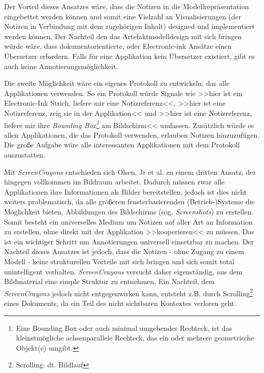 Der Vorteil dieses Ansatzes wäre, dass die Notizen in die Modellrepräsentation eingebettet werden können und somit eine Vielzahl an Visualisierungen (der Notizen in Verbindung mit dem zugehörigen Inhalt) designed und implementiert werden können. Der Nachteil den das Artefaktmodelldesign mit sich bringen würde wäre, dass dokumentorientierte, oder Electronic-ink Ansätze einen Übersetzer erfordern. Falls für eine Applikation kein Übersetzer existiert, gibt es auch keine Annotierungsmöglichkeit.

\medskip Die zweite Möglichkeit wäre ein eigenes Protokoll zu entwickeln, das alle Applikationen verwenden. So ein Protokoll würde Signale wie >>hier ist ein Electronic-Ink Strich, liefere mir eine Notizreferenz<<, >>hier ist eine Notizreferenz, zeig sie in der Applikation<< und >>hier ist eine Notizreferenz, liefere mir ihre \emph{Bounding Box\footnote{Eine Bounding Box oder auch minimal umgebendes Rechteck, ist das kleinstmögliche achsenparallele Rechteck, das ein oder mehrere geometrische Objekt(e) umgibt.}} am Bildschirm<< umfassen. Zusätzlich würde es allen Applikationen, die das Protokoll verwenden, erlauben Notizen hinzuzufügen. Die große Aufgabe wäre alle interessanten Applikationen mit dem Protokoll auszustatten.

\medskip Mit \emph{ScreenCrayons} entschieden sich Olsen, Jr et al. zu einem dritten Ansatz, der hingegen vollkommen im Bildraum arbeitet. Dadurch müssen zwar alle Applikationen ihre Informationen als Bilder bereitstellen, jedoch ist dies nicht weiters problematisch, da alle größeren fensterbasierenden (Betrieb-)Systeme die Möglichkeit bieten, Abbildungen des Bildschirms (sog. \emph{Screenshots}) zu erstellen.  Somit besteht ein universelles Medium um Notizen auf aller Art an Information zu erstellen, ohne direkt mit der Applikation >>kooperieren<< zu müssen. Das ist ein wichtiger Schritt um Annotierungen universell einsetzbar zu machen. Der Nachteil dieses Ansatzes ist jedoch, dass die Notizen - ohne Zugang zu einem Modell - keine strukturellen Vorteile mit sich bringen und sich somit total unintelligent verhalten. \emph{ScreenCrayons} versucht daher  eigenständig, aus dem Bildmaterial eine simple Struktur zu entnehmen. Ein Nachteil, dem \emph{ScreenCrayons} jedoch nicht entgegenwirken kann, entsteht z.B. durch Scrolling\footnote{Scrolling: dt. Bildlauf} eines Dokuments, da ein Teil des nicht sichtbaren Kontextes verloren geht.

